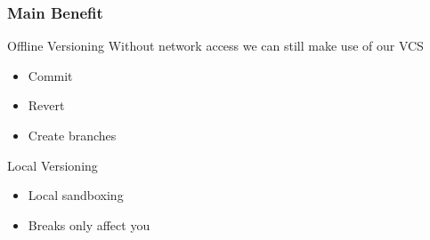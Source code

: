\begin{frame}
	\frametitle{Main Benefit}
	\begin{block}{Offline Versioning}
		Without network access we can still make use of our VCS
		\begin{itemize}
			\item Commit
			\item Revert
			\item Create branches
		\end{itemize}
	\end{block}
	\begin{block}{Local Versioning}
		\begin{itemize}
			\item Local sandboxing
			\item Breaks only affect you
		\end{itemize}
	\end{block}
\end{frame}
